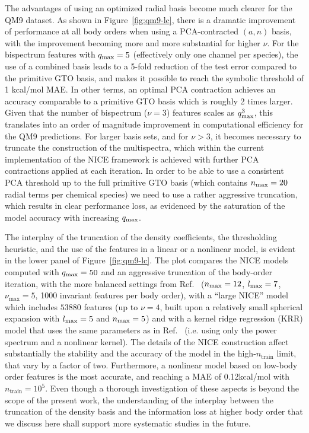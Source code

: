 The advantages of using an optimized radial basis become much clearer for the QM9 dataset.  As shown in Figure~\ref{fig:qm9-lc}, there is a dramatic improvement of performance at all body orders when using a PCA-contracted $(a,n)$ basis, with the improvement becoming more and more substantial for higher $\nu$. 
For the bispectrum features with $q_\mathrm{max}=5$ (effectively only one channel per species), the use of a combined basis leads to a 5-fold reduction of the test error compared to the primitive GTO basis, and makes it possible to reach the symbolic threshold of 1 kcal/mol MAE.
In other terms, an optimal PCA contraction achieves an accuracy comparable to a primitive GTO basis which is roughly 2 times larger. Given that the number of bispectrum ($\nu=3$) features scales as $q_\mathrm{max}^3$, this translates into an order of magnitude improvement in computational efficiency for the QM9 predictions.
For larger basis sets, and for $\nu>3$, it becomes necessary to truncate the construction of the multispectra, which within the current implementation of the NICE framework is achieved with further PCA contractions applied at each iteration.
In order to be able to use a consistent PCA threshold up to the full primitive GTO basis (which contains $n_\mathrm{max}=20$ radial terms per chemical species) we need to use a rather aggressive truncation, which results in clear performance loss, as evidenced by the saturation of the model accuracy with increasing $q_\mathrm{max}$. 

The interplay of the truncation of the density coefficients, the thresholding heuristic, and the use of the features in a linear or a nonlinear model, is evident in the lower panel of Figure~\ref{fig:qm9-lc}.
The plot compares the NICE models computed with $q_\mathrm{max}=50$ and an aggressive truncation of the body-order iteration, with the more balanced settings from Ref.~ ($n_\mathrm{max}=12$, $l_\mathrm{max}=7$, $\nu_\text{max}=5$, 1000 invariant features per body order),
with a ``large NICE'' model which includes $53880$ features (up to $\nu=4$, built upon a relatively small spherical expansion  with $l_\mathrm{max} = 5$ and $n_\mathrm{max}=5$) and with a kernel ridge regression (KRR) model that uses the same parameters as in Ref.~ (i.e. using only the power spectrum and a nonlinear kernel).
The details of the NICE construction affect substantially the stability and the accuracy of the model in the high-$n_\text{train}$ limit, that vary by a factor of two.
Furthermore, a nonlinear model based on low-body order features is the most accurate, and reaching a MAE of 0.12kcal/mol with $n_{\text{train}}=10^5$. Even though a thorough investigation of these aspects is beyond the scope of the present work, the understanding of the interplay between the truncation of the density basis and the information loss at higher body order that we discuss here shall support more systematic studies in the future. 

